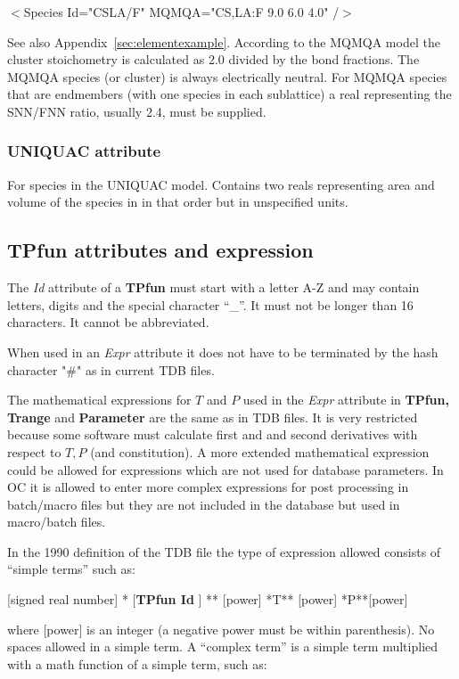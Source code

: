 \documentclass{article}
\begin{document}
  $<$Species Id="CSLA/F"  MQMQA="CS,LA:F  9.0 6.0 4.0" /$>$

See also Appendix~\ref{sec:elementexample}.  According to the MQMQA
model the cluster stoichometry is calculated as 2.0 divided by the
bond fractions.  The MQMQA species (or cluster) is always electrically
neutral.  For MQMQA species that are endmembers (with one species in
each sublattice) a real representing the SNN/FNN ratio, usually 2.4,
must be supplied.

\subsubsection{UNIQUAC attribute}\label{sec:uniquac}
For species in the UNIQUAC model.  Contains two reals representing
area and volume of the species in in that order but in unspecified
units.

\subsection{TPfun attributes and expression}\label{sec:tpfunattr}\label{sec:expr}

The {\em Id} attribute of a {\bf TPfun} must start with a letter A-Z
and may contain letters, digits and the special character ``\_''.  It
must not be longer than 16 characters.  It cannot be abbreviated.

When used in an {\em Expr} attribute it does not have to be terminated
by the hash character "\#" as in current TDB files.

The mathematical expressions for $T$ and $P$ used in the {\em Expr}
attribute in {\bf TPfun, Trange} and {\bf Parameter} are the same as
in TDB files.  It is very restricted because some software must
calculate first and and second derivatives with respect to $T, P$ (and
constitution).  A more extended mathematical expression could be
allowed for expressions which are not used for database parameters.
In OC it is allowed to enter more complex expressions for post
processing in batch/macro files but they are not included in the
database but used in macro/batch files.

In the 1990 definition of the TDB file the type of expression allowed
consists of ``simple terms'' such as:

[signed real number] * [{\bf TPfun Id} ] ** [power] *T** [power] *P**[power]

where [power] is an integer (a negative power must be within
parenthesis).  No spaces allowed in a simple term.  A ``complex term''
is a simple term multiplied with a math function of a simple term,
such as:
\end{document}

